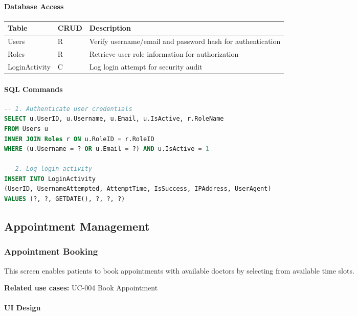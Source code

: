 \documentclass[12pt,a4paper]{article}
\begin{document}
\paragraph{Database Access}

\begin{longtable}{|p{3cm}|p{2cm}|p{9cm}|}
\hline
\textbf{Table} & \textbf{CRUD} & \textbf{Description} \\
\hline
Users & R & Verify username/email and password hash for authentication \\
\hline
Roles & R & Retrieve user role information for authorization \\
\hline
LoginActivity & C & Log login attempt for security audit \\
\hline
\end{longtable}

\paragraph{SQL Commands}

\begin{lstlisting}[language=SQL]
-- 1. Authenticate user credentials
SELECT u.UserID, u.Username, u.Email, u.IsActive, r.RoleName
FROM Users u 
INNER JOIN Roles r ON u.RoleID = r.RoleID
WHERE (u.Username = ? OR u.Email = ?) AND u.IsActive = 1

-- 2. Log login activity
INSERT INTO LoginActivity 
(UserID, UsernameAttempted, AttemptTime, IsSuccess, IPAddress, UserAgent)
VALUES (?, ?, GETDATE(), ?, ?, ?)
\end{lstlisting}

\subsection{Appointment Management}

\subsubsection{Appointment Booking}

This screen enables patients to book appointments with available doctors by selecting from available time slots.

\textbf{Related use cases:} UC-004 Book Appointment

\paragraph{UI Design}
\end{document}
